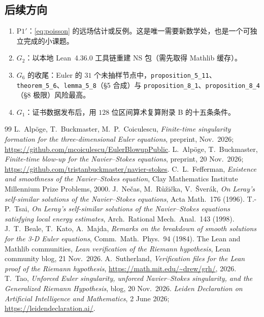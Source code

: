 \documentclass[11pt,a4paper]{ctexart}
\theoremstyle{definition}
\begin{document}
\subsection*{后续方向}

\begin{enumerate}[label=(\roman*)]
\item $\mathrm{P1}'$：\eqref{eq:poisson} 的远场估计或反例。这是唯一需要新数学处，也是一个可独立完成的小课题。
\item $G_2$：以本地 Lean~4.36.0 工具链重建 NS 包（需先取得 Mathlib 缓存）。
\item $G_6$ 的收尾：Euler 的 $31$ 个未抽样节点中，\texttt{proposition\_5\_11}、\texttt{theorem\_5\_6}、\texttt{lemma\_5\_8}（\S5 合成）与 \texttt{proposition\_8\_1}、\texttt{proposition\_8\_4}（\S8 极限）风险最高。
\item $G_1$：证书数据发布后，用 $128$ 位区间算术复算附录 B 的十五条条件。
\end{enumerate}

\begin{thebibliography}{99}\small
{} L.~Alp\"oge, T.~Buckmaster, M.~P.~Coiculescu, \emph{Finite-time singularity formation for the three-dimensional Euler equations}, preprint, Nov.~2026; \url{https://github.com/mcoiculescu/EulerBlowupPublic}.
 L.~Alp\"oge, T.~Buckmaster, \emph{Finite-time blow-up for the Navier--Stokes equations}, preprint, 20 Nov.~2026; \url{https://github.com/tristanbuckmaster/navier-stokes}.
 C.~L.~Fefferman, \emph{Existence and smoothness of the Navier--Stokes equation}, Clay Mathematics Institute Millennium Prize Problems, 2000.
 J.~Ne\v{c}as, M.~R\r{u}\v{z}i\v{c}ka, V.~{\v{S}}ver\'ak, \emph{On Leray's self-similar solutions of the Navier--Stokes equations}, Acta Math.~176 (1996).
 T.-P.~Tsai, \emph{On Leray's self-similar solutions of the Navier--Stokes equations satisfying local energy estimates}, Arch.~Rational Mech.~Anal.~143 (1998).
 J.~T.~Beale, T.~Kato, A.~Majda, \emph{Remarks on the breakdown of smooth solutions for the 3-D Euler equations}, Comm.~Math.~Phys.~94 (1984).
 The Lean and Mathlib communities, \emph{Lean verification of the Riemann hypothesis}, Lean community blog, 21 Nov.~2026.
 A.~Sutherland, \emph{Verification files for the Lean proof of the Riemann hypothesis}, \url{https://math.mit.edu/~drew/grh/}, 2026.
 T.~Tao, \emph{Unforced Euler singularity, unforced Navier--Stokes singularity, and the Generalized Riemann Hypothesis}, blog, 20 Nov.~2026.
 \emph{Leiden Declaration on Artificial Intelligence and Mathematics}, 2 June 2026; \url{https://leidendeclaration.ai/}.
\end{thebibliography}
\end{document}
